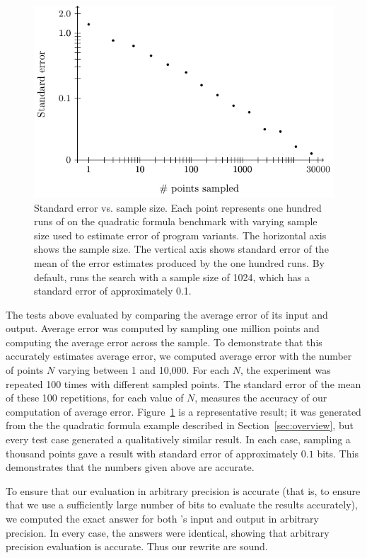 \documentclass[paper.tex]{subfiles}
\begin{document}
\begin{figure}
\includegraphics[width=0.9\columnwidth]{fig/eval-err.pdf}
\caption{Standard error vs. sample size. Each point represents one
  hundred runs of \casio on the quadratic formula benchmark with
  varying sample size used to estimate error of program variants. The
  horizontal axis shows the sample size. The vertical axis shows
  standard error of the mean of the error estimates produced by the
  one hundred runs. By default, \casio runs the search with a sample
  size of 1024, which has a standard error of approximately 0.1.}

\label{fig:eval-err}
\end{figure}

The tests above evaluated \casio by comparing the average error of its
input and output.  Average error was computed by sampling one million
points and computing the average error across the sample.  To
demonstrate that this accurately estimates average error, we computed
average error with the number of points $N$ varying between 1 and
10,000.  For each $N$, the experiment was repeated 100 times with
different sampled points.  The standard error of the mean of these 100
repetitions, for each value of $N$, measures the accuracy of our
computation of average error.  Figure~\ref{fig:eval-err} is a
representative result; it was generated from the the quadratic formula
example described in Section~\ref{sec:overview}, but every test case
generated a qualitatively similar result.  In each case, sampling a
thousand points gave a result with standard error of approximately
$0.1$ bits.  This demonstrates that the numbers given above are
accurate.

To ensure that our evaluation in arbitrary precision is accurate (that
is, to ensure that we use a sufficiently large number of bits to
evaluate the results accurately), we computed the exact answer for
both \casio's input and output in arbitrary precision.  In every case,
the answers were identical, showing that arbitrary precision
evaluation is accurate. Thus our rewrite are sound.
\end{document}
